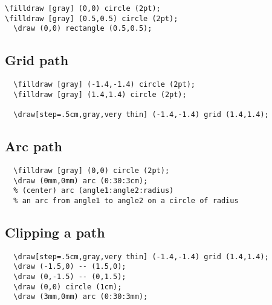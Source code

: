\begin{lstlisting}
\filldraw [gray] (0,0) circle (2pt);
\filldraw [gray] (0.5,0.5) circle (2pt);
  \draw (0,0) rectangle (0.5,0.5);
\end{lstlisting}



\subsection{Grid path}
\label{sec:grid-path}

\begin{lstlisting}
  \filldraw [gray] (-1.4,-1.4) circle (2pt);
  \filldraw [gray] (1.4,1.4) circle (2pt);

  \draw[step=.5cm,gray,very thin] (-1.4,-1.4) grid (1.4,1.4);
\end{lstlisting}



\subsection{Arc path}
\label{sec:arc-path}

\begin{lstlisting}
  \filldraw [gray] (0,0) circle (2pt);
  \draw (0mm,0mm) arc (0:30:3cm);
  % (center) arc (angle1:angle2:radius)
  % an arc from angle1 to angle2 on a circle of radius

\end{lstlisting}




\subsection{Clipping a path}
\label{sec:clipping-path}
\begin{lstlisting}
  \draw[step=.5cm,gray,very thin] (-1.4,-1.4) grid (1.4,1.4);
  \draw (-1.5,0) -- (1.5,0);
  \draw (0,-1.5) -- (0,1.5);
  \draw (0,0) circle (1cm);
  \draw (3mm,0mm) arc (0:30:3mm);  

\end{lstlisting}

